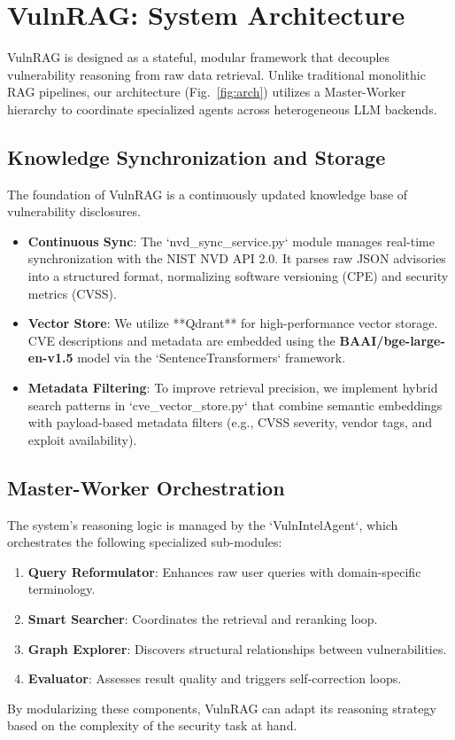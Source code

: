 \section{VulnRAG: System Architecture}
\label{sec:design}

VulnRAG is designed as a stateful, modular framework that decouples vulnerability reasoning from raw data retrieval. Unlike traditional monolithic RAG pipelines, our architecture (Fig.~\ref{fig:arch}) utilizes a Master-Worker hierarchy to coordinate specialized agents across heterogeneous LLM backends.

\subsection{Knowledge Synchronization and Storage}
The foundation of VulnRAG is a continuously updated knowledge base of vulnerability disclosures. 
\begin{itemize}
    \item \textbf{Continuous Sync}: The `nvd_sync_service.py` module manages real-time synchronization with the NIST NVD API 2.0. It parses raw JSON advisories into a structured format, normalizing software versioning (CPE) and security metrics (CVSS).
    \item \textbf{Vector Store}: We utilize **Qdrant** for high-performance vector storage. CVE descriptions and metadata are embedded using the \textbf{BAAI/bge-large-en-v1.5} model via the `SentenceTransformers` framework.
    \item \textbf{Metadata Filtering}: To improve retrieval precision, we implement hybrid search patterns in `cve_vector_store.py` that combine semantic embeddings with payload-based metadata filters (e.g., CVSS severity, vendor tags, and exploit availability).
\end{itemize}

\subsection{Master-Worker Orchestration}
The system's reasoning logic is managed by the `VulnIntelAgent`, which orchestrates the following specialized sub-modules:
\begin{enumerate}
    \item \textbf{Query Reformulator}: Enhances raw user queries with domain-specific terminology.
    \item \textbf{Smart Searcher}: Coordinates the retrieval and reranking loop.
    \item \textbf{Graph Explorer}: Discovers structural relationships between vulnerabilities.
    \item \textbf{Evaluator}: Assesses result quality and triggers self-correction loops.
\end{enumerate}

By modularizing these components, VulnRAG can adapt its reasoning strategy based on the complexity of the security task at hand.
